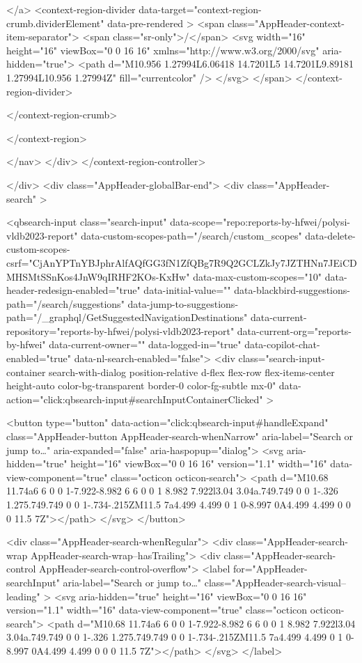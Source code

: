 </a>
      <context-region-divider data-target="context-region-crumb.dividerElement" data-pre-rendered >
  <span class="AppHeader-context-item-separator">
    <span class="sr-only">/</span>
    <svg width="16" height="16" viewBox="0 0 16 16" xmlns="http://www.w3.org/2000/svg" aria-hidden="true">
      <path d="M10.956 1.27994L6.06418 14.7201L5 14.7201L9.89181 1.27994L10.956 1.27994Z" fill="currentcolor" />
    </svg>
  </span>
</context-region-divider>

    </context-region-crumb>

</context-region>

    </nav>
  </div>
</context-region-controller>

      </div>
      <div class="AppHeader-globalBar-end">
          <div class="AppHeader-search" >
              


<qbsearch-input class="search-input" data-scope="repo:reports-by-hfwei/polysi-vldb2023-report" data-custom-scopes-path="/search/custom_scopes" data-delete-custom-scopes-csrf="CjAnYPTnYBJphrAlfAQfGG3fN1ZfQBg7R9Q2GCLZkJy7JZTHNn7JEiCDMHSMtSSnKos4JnW9qIRHF2KOs-KxHw" data-max-custom-scopes="10" data-header-redesign-enabled="true" data-initial-value="" data-blackbird-suggestions-path="/search/suggestions" data-jump-to-suggestions-path="/_graphql/GetSuggestedNavigationDestinations" data-current-repository="reports-by-hfwei/polysi-vldb2023-report" data-current-org="reports-by-hfwei" data-current-owner="" data-logged-in="true" data-copilot-chat-enabled="true" data-nl-search-enabled="false">
  <div
    class="search-input-container search-with-dialog position-relative d-flex flex-row flex-items-center height-auto color-bg-transparent border-0 color-fg-subtle mx-0"
    data-action="click:qbsearch-input#searchInputContainerClicked"
  >
      
            <button type="button" data-action="click:qbsearch-input#handleExpand" class="AppHeader-button AppHeader-search-whenNarrow" aria-label="Search or jump to…" aria-expanded="false" aria-haspopup="dialog">
            <svg aria-hidden="true" height="16" viewBox="0 0 16 16" version="1.1" width="16" data-view-component="true" class="octicon octicon-search">
    <path d="M10.68 11.74a6 6 0 0 1-7.922-8.982 6 6 0 0 1 8.982 7.922l3.04 3.04a.749.749 0 0 1-.326 1.275.749.749 0 0 1-.734-.215ZM11.5 7a4.499 4.499 0 1 0-8.997 0A4.499 4.499 0 0 0 11.5 7Z"></path>
</svg>
          </button>


<div class="AppHeader-search-whenRegular">
  <div class="AppHeader-search-wrap AppHeader-search-wrap--hasTrailing">
    <div class="AppHeader-search-control AppHeader-search-control-overflow">
      <label
        for="AppHeader-searchInput"
        aria-label="Search or jump to…"
        class="AppHeader-search-visual--leading"
      >
        <svg aria-hidden="true" height="16" viewBox="0 0 16 16" version="1.1" width="16" data-view-component="true" class="octicon octicon-search">
    <path d="M10.68 11.74a6 6 0 0 1-7.922-8.982 6 6 0 0 1 8.982 7.922l3.04 3.04a.749.749 0 0 1-.326 1.275.749.749 0 0 1-.734-.215ZM11.5 7a4.499 4.499 0 1 0-8.997 0A4.499 4.499 0 0 0 11.5 7Z"></path>
</svg>
      </label>

